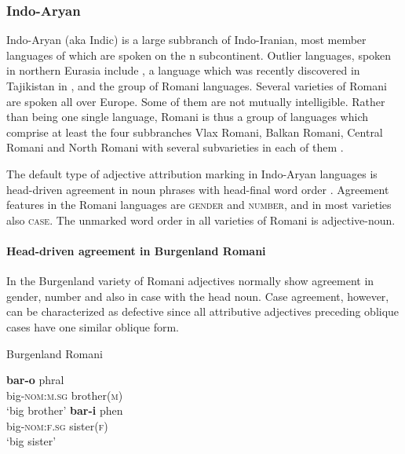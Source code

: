 \subsubsection{Indo-Aryan}
Indo-Aryan (aka Indic) is a large subbranch of Indo-Iranian, most member languages of which are spoken on the n subcontinent. Outlier languages, spoken in northern Eurasia include , a language which was recently discovered in Tajikistan in  \cite[22]{masica1991}, and the group of Romani languages. Several varieties of Romani are spoken all over Europe. Some of them are not mutually intelligible. Rather than being one single language, Romani is thus a group of languages which comprise at least the four subbranches Vlax Romani, Balkan Romani, Central Romani and North Romani with several subvarieties in each of them \citep[2–3]{halwachs-etal2002}.

The default type of adjective attribution marking in Indo-Aryan languages is head-driven agreement in noun phrases with head-final word order \cite[369]{masica1991}. Agreement features in the Romani languages are \textsc{gender} and \textsc{number}, and in most varieties also \textsc{case}. The unmarked word order in all varieties of Romani is adjective-noun.

\paragraph{Head-driven agreement in Burgenland Romani}
In the Burgenland variety of Romani adjectives normally show agreement in gender, number and also in case with the head noun. Case agreement, however, can be characterized as defective since all attributive adjectives preceding oblique cases have one similar oblique form.
\begin{exe}
\ex \rm{Burgenland Romani \citep[22–23]{halwachs-etal2002}}
\begin{xlist} 
\ex 
\gll	\textbf{bar-o} phral\\
	big-\textsc{nom:m.sg} brother(\textsc{m})\\
\glt	‘big brother’
\ex
\gll	\textbf{bar-i} phen\\
	big-\textsc{nom:f.sg} sister(\textsc{f})\\
\glt	‘big sister’
\end{xlist}
\end{exe}

